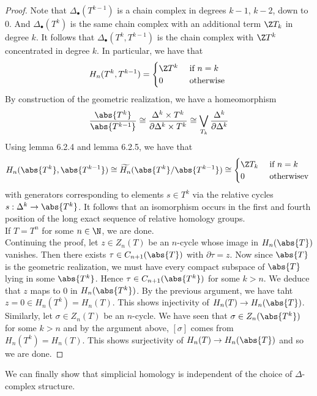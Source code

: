 \documentclass[a4paper]{article}
\begin{document}
\begin{thm}{}{}
\begin{proof}
Note that $\Delta_\bullet(T^{k-1})$ is a chain complex in degrees $k-1$, $k-2$, down to $0$. And $\Delta_\bullet(T^k)$ is the same chain complex with an additional term $\Z T_k$ in degree $k$. It follows that $\Delta_\bullet(T^k,T^{k-1})$ is the chain complex with $\Z T^k$ concentrated in degree $k$. In particular, we have that $$H_n(T^k,T^{k-1})=\begin{cases}
\Z T^k & \text{ if } n=k\\
0 & \text{ otherwise }
\end{cases}$$
By construction of the geometric realization, we have a homeomorphism $$\frac{\abs{T^k}}{\abs{T^{k-1}}}\cong\frac{\Delta^k\times T^k}{\partial\Delta^k\times T^k}\cong\bigvee_{T_k}\frac{\Delta^k}{\partial\Delta^k}$$ Using lemma 6.2.4 and lemma 6.2.5, we have that $$H_n(\abs{T^k},\abs{T^{k-1}})\cong\widetilde{H_n}(\abs{T^k}/\abs{T^{k-1}})\cong\begin{cases}
\Z T_k & \text{ if } n=k\\
0 & \text{ otherwisev }
\end{cases}$$
with generators corresponding to elements $s\in T^k$ via the relative cycles $s:\Delta^k\to\abs{T^k}$. It follows that an isomorphism occurs in the first and fourth position of the long exact sequence of relative homology groups. \\

If $T=T^n$ for some $n\in\N$, we are done. \\

Continuing the proof, let $z\in Z_n(T)$ be an $n$-cycle whose image in $H_n(\abs{T})$ vanishes. Then there exists $\tau\in C_{n+1}(\abs{T})$ with $\partial\tau=z$. Now since $\abs{T}$ is the geometric realization, we must have every compact subspace of $\abs{T}$ lying in some $\abs{T^k}$. Hence $\tau\in C_{n+1}(\abs{T^k})$ for some $k>n$. We deduce that $z$ maps to $0$ in $H_n(\abs{T^k})$. By the previous argument, we have taht $z=0\in H_n(T^k)=H_n(T)$. This shows injectivity of $H_n(T)\to H_n(\abs{T})$. \\

Similarly, let $\sigma\in Z_n(T)$ be an $n$-cycle. We have seen that $\sigma\in Z_n(\abs{T^k})$ for some $k>n$ and by the argument above, $[\sigma]$ comes from $H_n(T^k)=H_n(T)$. This shows surjectivity of $H_n(T)\to H_n(\abs{T})$ and so we are done. 
\end{proof}
\end{thm}

We can finally show that simplicial homology is independent of the choice of $\Delta$-complex structure. 
\end{document}
